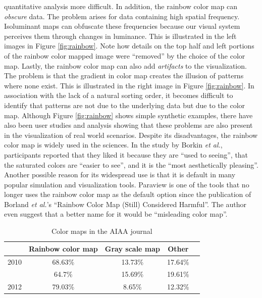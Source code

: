 quantitative analysis more difficult\cite{Borland:2007:RCM:1251554.1251614}.  
%
In addition, the rainbow color map can \emph{obscure} data. The problem arises 
for data containing high spatial frequency. Isoluminant maps can obfuscate these frequencies 
because our visual system perceives them through changes in luminance. 
%
This is illustrated in the left images in Figure \ref{fig:rainbow}.
%
Note how details on the top half and left portions of the rainbow color mapped image  were ``removed'' by the choice of the color map.
%
Lastly, the rainbow color map can also add \emph{artifacts} to the visualization\cite{treinishshould}. 
The problem is that the gradient in color map creates the illusion of patterns where none exist. This 
is illustrated in the right image in Figure \ref{fig:rainbow}. In association with the lack of a natural sorting order, 
it becomes difficult to identify that patterns are not due to the underlying data but due to the color map. 
%
Although Figure \ref{fig:rainbow} shows simple synthetic examples, there have also been user studies and 
analysis showing that these problems are also present in the visualization of real world scenarios\cite{treinishshould}.
%
Despite its disadvantages, the rainbow color map is widely used in the sciences. In the study by Borkin 
\emph{et al.}\cite{305}, participants reported that they liked it because they are ``used to seeing'', that 
the saturated colors are ``easier to see'', and it is the ``most aesthetically pleasing''. 
%
Another possible reason  for its widespread use is that it is default in many popular simulation and 
visualization tools. Paraview is one of the tools that no longer uses the rainbow color map as the
default option since the publication of  Borland \emph{et al.}'s ``Rainbow Color Map (Still) Considered 
Harmful''\cite{paraview}. The author even suggest that a better name for it would be ``misleading color map''.
%


\begin{table}
\caption{Color maps in the AIAA journal} \label{table:aiaa_colormap}{}\centering
\begin{tabular}{lcccc}
				&  	Rainbow color map	 & Gray scale map & Other\\ \hline
	2010		&       68.63\%		   	 &        13.73\% & 17.64\%    		          \\
\gc	2011		& 		64.7\%		 	 &        15.69\%& 19.61\%      		     	  \\
	2012		&       79.03\% 	     &        8.65\% & 12.32\%        		      \\
\end{tabular}
\end{table}


